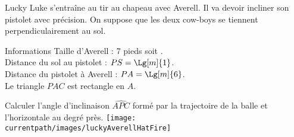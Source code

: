 \begin{exercice*}
    Lucky Luke s'entraîne au tir au chapeau avec Averell. Il va devoir incliner son pistolet avec précision.
    On suppose que les deux cow-boys se tiennent perpendiculairement au sol.
    \begin{myBox}{ Informations}
        Taille d'Averell : 7 pieds soit .\\
        Distance du sol au pistolet : $PS = \Lg[m]{1}$.\\
        Distance du pistolet à Averell : $PA = \Lg[m]{6}$.\\
        Le triangle $PAC$ est rectangle en $A$.
    \end{myBox}
    Calculer l'angle d'inclinaison $\widehat{APC}$ formé par la trajectoire de la balle et l'horizontale au degré près.
    \texttt{[image: \\currentpath/images/luckyAverellHatFire]}
\end{exercice*}

